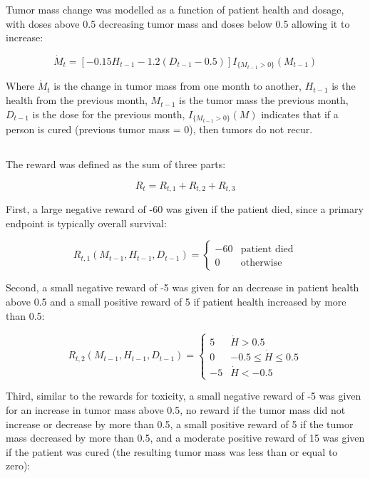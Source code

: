\documentclass[12pt]{article}
\begin{document}
Tumor mass change was modelled as a function of patient health and dosage, with doses above 0.5 decreasing tumor mass and doses below 0.5 allowing it to increase:

\[
\dot{M}_{t} = [- 0.15 H_{t-1} - 1.2 (D_{t-1} - 0.5)] I_{\{M_{t-1} > 0\}}(M_{t-1})
\]

Where $\dot{M}_{t}$ is the change in tumor mass from one month to another,
$H_{t-1}$ is the health from the previous month,
$M_{t-1}$ is the tumor mass the previous month,
$D_{t-1}$ is the dose for the previous month,
$I_{\{M_{t-1} > 0\}}(M)$ indicates that if a person is cured (previous tumor mass = 0), then tumors do not recur.



\subsection{} %
\label{sub:}

The reward was defined as the sum of three parts: 

\[
R_{t} = R_{t, 1} + R_{t, 2} + R_{t, 3}
\]

First, a large negative reward of -60 was given if the patient died, since a primary endpoint is typically overall survival:

\[
R_{t, 1}(M_{t-1}, H_{t-1}, D_{t-1}) = 
\begin{cases}
  -60 & \text{patient died} \\
  0 & \text{otherwise}
\end{cases}
\]

Second, a small negative reward of -5 was given for an decrease in patient health above 0.5 and a small positive reward of 5 if patient health increased by more than 0.5:

\[
R_{t, 2}(M_{t-1}, H_{t-1}, D_{t-1}) =  
\begin{cases}
  5 & \dot{H} > 0.5 \\
  0 & -0.5 \leq \dot{H} \leq 0.5 \\
  -5 & \dot{H} < -0.5
\end{cases}
\]

Third, similar to the rewards for toxicity, a small negative reward of -5 was given for an increase in tumor mass above 0.5, no reward if the tumor mass did not increase or decrease by more than 0.5, a small positive reward of 5 if the tumor mass decreased by more than 0.5, and a moderate positive reward of 15 was given if the patient was cured (the resulting tumor mass was less than or equal to zero):
\end{document}
